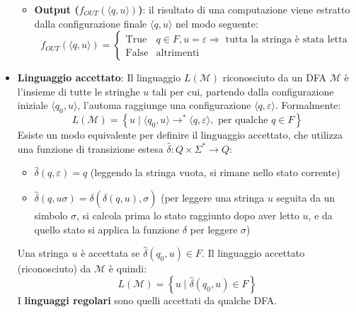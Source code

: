 \documentclass[12pt, a4paper]{report}
\begin{document}
\begin{itemize}
\begin{itemize}
                        \item \textbf{Output ($f_{OUT}(\langle q,u\rangle)$)}: il risultato di una computazione viene estratto dalla configurazione finale $\langle q,u\rangle$ nel modo seguente: \begin{equation*}
                            f_{OUT}(\langle q,u\rangle) = \begin{cases}
                                \text{True} & q\in F, u=\varepsilon\Rightarrow\text{ tutta la stringa è stata letta}\\
                                \text{False} & \text{altrimenti} 
                            \end{cases}
                        \end{equation*}
                    \end{itemize}
                    \item \textbf{Linguaggio accettato}: Il linguaggio $L(\mathcal{M})$ riconosciuto da un DFA $\mathcal{M}$ è l'insieme di tutte le stringhe $u$ tali per cui, partendo dalla configurazione iniziale $\langle q_0, u\rangle$, l'automa raggiunge una configurazione $\langle q,\varepsilon\rangle$. Formalmente: \begin{equation*}
                        L(\mathcal{M})=\left\{u\mid\langle q_0,u\rangle\to^*\langle q,\varepsilon\rangle, \text{ per qualche } q\in F\right\}
                    \end{equation*}
                    Esiste un modo equivalente per definire il linguaggio accettato, che utilizza una funzione di transizione estesa $\hat{\delta}:Q\times\Sigma^*\to Q$: \begin{itemize}
                        \item $\hat{\delta}(q, \varepsilon) = q$ (leggendo la stringa vuota, si rimane nello stato corrente)
                        \item $\hat{\delta}(q, u\sigma) = \delta(\hat{\delta}(q, u), \sigma)$ (per leggere una stringa $u$ seguita da un simbolo $\sigma$, si calcola prima lo stato raggiunto dopo aver letto $u$, e da quello stato si applica la funzione $\delta$ per leggere $\sigma$)
                    \end{itemize}
                    Una stringa $u$ è accettata se $\hat{\delta}(q_0, u) \in F$. Il linguaggio accettato (riconosciuto) da $\mathcal{M}$ è quindi: \begin{equation*}
                        L(\mathcal{M})=\left\{u\mid\hat{\delta}(q_0,u)\in F\right\}
                    \end{equation*}
                    I \textbf{linguaggi regolari} sono quelli accettati da qualche DFA.  
                \end{itemize}
\end{document}
